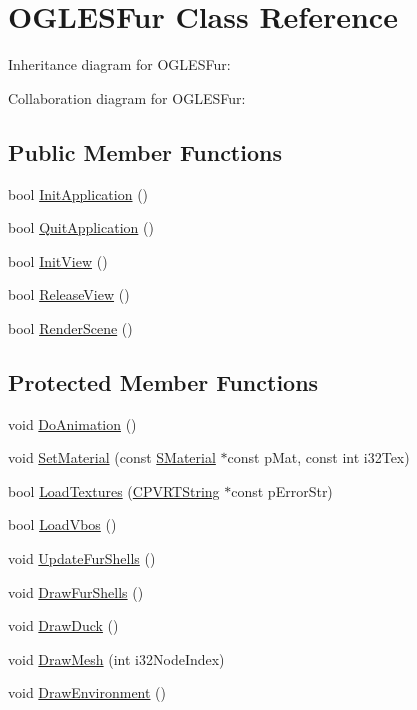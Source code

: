 \hypertarget{class_o_g_l_e_s_fur}{\section{O\+G\+L\+E\+S\+Fur Class Reference}
\label{class_o_g_l_e_s_fur}
}


Inheritance diagram for O\+G\+L\+E\+S\+Fur\+:


Collaboration diagram for O\+G\+L\+E\+S\+Fur\+:
\subsection*{Public Member Functions}
\begin{DoxyCompactItemize}
\item 
bool \hyperlink{class_o_g_l_e_s_fur_a75fce6dec2b76040b6a95cc778b3c3fe}{Init\+Application} ()
\item 
bool \hyperlink{class_o_g_l_e_s_fur_a54b206488725868a6480bdbc6005f410}{Quit\+Application} ()
\item 
bool \hyperlink{class_o_g_l_e_s_fur_a7e3bc3a4ebeb23a7553dbc4b50d25893}{Init\+View} ()
\item 
bool \hyperlink{class_o_g_l_e_s_fur_a9f4892b7cc2962289125be0e5ba1f354}{Release\+View} ()
\item 
bool \hyperlink{class_o_g_l_e_s_fur_a48afd2a178887b797e9fc6a5948286d9}{Render\+Scene} ()
\end{DoxyCompactItemize}
\subsection*{Protected Member Functions}
\begin{DoxyCompactItemize}
\item 
void \hyperlink{class_o_g_l_e_s_fur_a0e7519d4b71712cf4f8a31b3f98f1a65}{Do\+Animation} ()
\item 
void \hyperlink{class_o_g_l_e_s_fur_a9f769f6b8656b57fe8e4f7d5adaa5f13}{Set\+Material} (const \hyperlink{struct_s_material}{S\+Material} $\ast$const p\+Mat, const int i32\+Tex)
\item 
bool \hyperlink{class_o_g_l_e_s_fur_add3a344d736ee932f64fe78ea7534dbf}{Load\+Textures} (\hyperlink{class_c_p_v_r_t_string}{C\+P\+V\+R\+T\+String} $\ast$const p\+Error\+Str)
\item 
bool \hyperlink{class_o_g_l_e_s_fur_a12cbf72b041c209f84ea44eae7287ace}{Load\+Vbos} ()
\item 
void \hyperlink{class_o_g_l_e_s_fur_ad3d714cf662a206a39d9f081fe400438}{Update\+Fur\+Shells} ()
\item 
void \hyperlink{class_o_g_l_e_s_fur_a3c910403d7862c7b1bc482040f0a0a27}{Draw\+Fur\+Shells} ()
\item 
void \hyperlink{class_o_g_l_e_s_fur_ae3186031e85335ac1f8c4840f5bb23d6}{Draw\+Duck} ()
\item 
void \hyperlink{class_o_g_l_e_s_fur_aec8a25ae22fac2bfb98c0e30dc2647e0}{Draw\+Mesh} (int i32\+Node\+Index)
\item 
void \hyperlink{class_o_g_l_e_s_fur_a48af768f47cd432e331ebd07748b52e1}{Draw\+Environment} ()
\end{DoxyCompactItemize}
